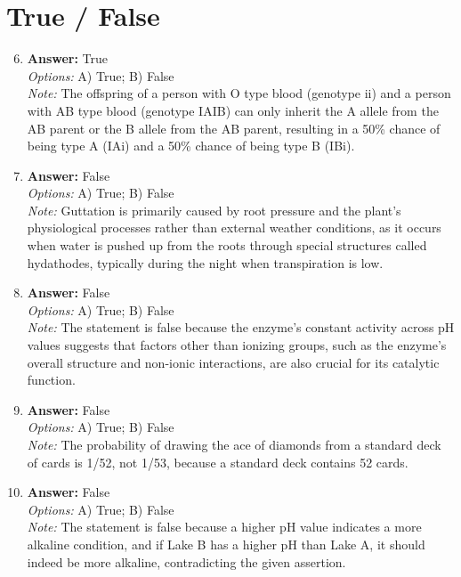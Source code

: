 \documentclass[12pt]{article}
\begin{document}
\section*{True / False}
\begin{enumerate}[label=\arabic*.]
\setcounter{enumi}{5}
\item \textbf{Answer:} True
\\ \textit{Options:} A) True; B) False
\\ \textit{Note:} The offspring of a person with O type blood (genotype ii) and a person with AB type blood (genotype IAIB) can only inherit the A allele from the AB parent or the B allele from the AB parent, resulting in a 50\% chance of being type A (IAi) and a 50\% chance of being type B (IBi).
\item \textbf{Answer:} False
\\ \textit{Options:} A) True; B) False
\\ \textit{Note:} Guttation is primarily caused by root pressure and the plant's physiological processes rather than external weather conditions, as it occurs when water is pushed up from the roots through special structures called hydathodes, typically during the night when transpiration is low.
\item \textbf{Answer:} False
\\ \textit{Options:} A) True; B) False
\\ \textit{Note:} The statement is false because the enzyme's constant activity across pH values suggests that factors other than ionizing groups, such as the enzyme's overall structure and non-ionic interactions, are also crucial for its catalytic function.
\item \textbf{Answer:} False
\\ \textit{Options:} A) True; B) False
\\ \textit{Note:} The probability of drawing the ace of diamonds from a standard deck of cards is 1/52, not 1/53, because a standard deck contains 52 cards.
\item \textbf{Answer:} False
\\ \textit{Options:} A) True; B) False
\\ \textit{Note:} The statement is false because a higher pH value indicates a more alkaline condition, and if Lake B has a higher pH than Lake A, it should indeed be more alkaline, contradicting the given assertion.
\end{enumerate}
\end{document}
